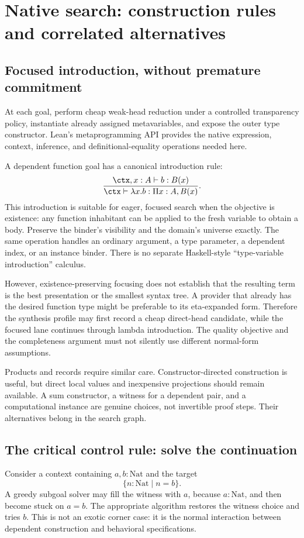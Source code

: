 \section{Native search: construction rules and correlated alternatives}
\label{sec:native}
\subsection{Focused introduction, without premature commitment}
At each goal, perform cheap weak-head reduction under a controlled transparency policy, instantiate already assigned metavariables, and expose the outer type constructor. Lean's metaprogramming API provides the native expression, context, inference, and definitional-equality operations needed here.\cite{metabook}

A dependent function goal has a canonical introduction rule:
\[
 \frac{\ctx,x:A\vdash b:B(x)}
      {\ctx\vdash \lambda x.b:\Pi x:A,B(x)}.
\]
This introduction is suitable for eager, focused search when the objective is existence: any function inhabitant can be applied to the fresh variable to obtain a body. Preserve the binder's visibility and the domain's universe exactly. The same operation handles an ordinary argument, a type parameter, a dependent index, or an instance binder. There is no separate Haskell-style ``type-variable introduction'' calculus.

However, existence-preserving focusing does not establish that the resulting term is the best presentation or the smallest syntax tree. A provider that already has the desired function type might be preferable to its eta-expanded form. Therefore the synthesis profile may first record a cheap direct-head candidate, while the focused lane continues through lambda introduction. The quality objective and the completeness argument must not silently use different normal-form assumptions.

Products and records require similar care. Constructor-directed construction is useful, but direct local values and inexpensive projections should remain available. A sum constructor, a witness for a dependent pair, and a computational instance are genuine choices, not invertible proof steps. Their alternatives belong in the search graph.

\subsection{The critical control rule: solve the continuation}
Consider a context containing $a,b:\mathrm{Nat}$ and the target
\[
 \{n:\mathrm{Nat}\mid n=b\}.
\]
A greedy subgoal solver may fill the witness with $a$, because $a:\mathrm{Nat}$, and then become stuck on $a=b$. The appropriate algorithm restores the witness choice and tries $b$. This is not an exotic corner case: it is the normal interaction between dependent construction and behavioral specifications.

